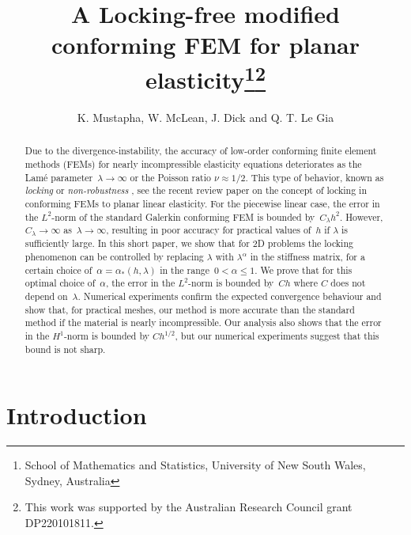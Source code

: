 \documentclass[11pt]{article}
\title{A Locking-free modified conforming FEM for planar elasticity\thanks{School of Mathematics and Statistics, University of New South Wales, Sydney, Australia}\thanks{This work was supported by the Australian Research Council
grant DP220101811.}}
\author{K. Mustapha, W. McLean, J. Dick and  Q. T. Le Gia}
\numberwithin{equation}{section}
\begin{document}
\maketitle
\begin{abstract}
{\color{red} Due to the divergence-instability, the accuracy of low-order conforming finite element methods (FEMs) for nearly incompressible elasticity equations deteriorates as the Lam\'e parameter~$\lambda\to\infty$ or the Poisson ratio $\nu \approx 1/2.$  This type of behavior, known as \emph{locking} or \emph{non-robustness} \cite{BabuskaSuri1992}, see the recent review paper \cite{AinsworthParker2022}  on the concept of locking in conforming FEMs to planar linear elasticity.} For the piecewise linear case, the error in the $L^2$-norm of the standard 
Galerkin conforming FEM is bounded by~$C_\lambda h^2$. However, $C_\lambda \to \infty$ 
as~$\lambda \to \infty$, resulting in poor accuracy for practical values of~$h$ if $\lambda$ is sufficiently 
large. In this short paper, we show that for 2D problems the locking phenomenon can be controlled by replacing 
$\lambda$ with $\lambda^\alpha$ in the stiffness matrix, for a certain choice of~$\alpha=\alpha_*(h,\lambda)$ 
in the range~$0<\alpha\le 1$.  We prove that for
this optimal choice of~$\alpha$, the error in the $L^2$-norm is bounded by~$Ch$ where $C$ does not
depend on~$\lambda$.  Numerical experiments confirm the expected convergence behaviour and show that, for practical meshes, our  method is more accurate than the standard method if the material is 
nearly incompressible.  Our analysis also shows that the error in the $H^1$-norm is bounded by $Ch^{1/2}$,
but our numerical experiments suggest that this bound is not sharp.
\end{abstract}
\section{Introduction}
\end{document}
